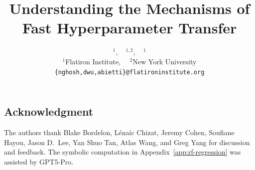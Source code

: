 \documentclass[10pt]{article}
\title{Understanding the Mechanisms of Fast Hyperparameter Transfer}
\author{
\text{Nikhil Ghosh}$^{1}$\!,\,\,~ 
\text{Denny Wu}$^{1,2}$\!,\,\,~ 
\text{Alberto Bietti}$^{1}$
\vspace{1.5mm} 
\\
\normalsize{$^{1}$Flatiron Institute},~~
\normalsize{$^{2}$New York University}
\\
{\small
\texttt{\{nghosh,dwu,abietti\}@flatironinstitute.org}
}
}
\begin{document}
\maketitle









\bigskip


\subsection*{Acknowledgment}

The authors thank Blake Bordelon, Lénaïc Chizat, Jeremy Cohen, Soufiane Hayou, Jason D.~Lee, Yan Shuo Tan, Atlas Wang, and Greg Yang for discussion and feedback. The symbolic computation in Appendix~\ref{app:rf-regression} was assisted by GPT5-Pro. 

\bigskip

{

\fontsize{10}{11}\selectfont 




}

\allowdisplaybreaks


\newpage
\appendix


\end{document}
